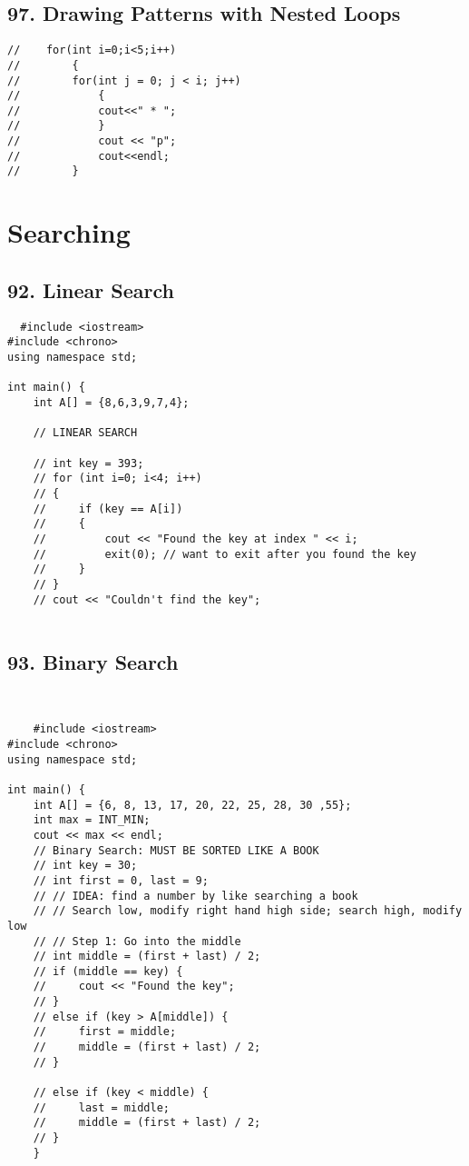 \documentclass[a4paper,12pt]{book}
\begin{document}
\section{97. Drawing Patterns with Nested Loops}

\begin{lstlisting}
//    for(int i=0;i<5;i++)
//        {
//        for(int j = 0; j < i; j++)
//            {
//            cout<<" * ";
//            }
//            cout << "p";
//            cout<<endl;
//        }
\end{lstlisting}



\chapter{Searching}
\section{92. Linear Search}

  \begin{lstlisting}
  #include <iostream>
#include <chrono>
using namespace std;

int main() {
    int A[] = {8,6,3,9,7,4};

    // LINEAR SEARCH
    
    // int key = 393;
    // for (int i=0; i<4; i++) 
    // {
    //     if (key == A[i]) 
    //     {
    //         cout << "Found the key at index " << i;
    //         exit(0); // want to exit after you found the key
    //     }
    // }
    // cout << "Couldn't find the key";
   
    \end{lstlisting}
    
\section{93. Binary Search}

  \begin{lstlisting}


    #include <iostream>
#include <chrono>
using namespace std;

int main() {
    int A[] = {6, 8, 13, 17, 20, 22, 25, 28, 30 ,55};
    int max = INT_MIN;
    cout << max << endl;
    // Binary Search: MUST BE SORTED LIKE A BOOK
    // int key = 30;
    // int first = 0, last = 9;
    // // IDEA: find a number by like searching a book
    // // Search low, modify right hand high side; search high, modify low
    // // Step 1: Go into the middle
    // int middle = (first + last) / 2;
    // if (middle == key) {
    //     cout << "Found the key";
    // }
    // else if (key > A[middle]) {
    //     first = middle;
    //     middle = (first + last) / 2;
    // }

    // else if (key < middle) {
    //     last = middle;
    //     middle = (first + last) / 2;
    // }
    }

\end{lstlisting}
\end{document}
